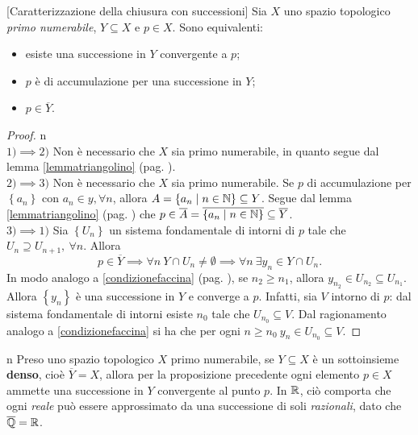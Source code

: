 \begin{proposition}{}[Caratterizzazione della chiusura con successioni]
	Sia $X$ uno spazio topologico \textit{primo numerabile}, $Y\subseteq X$ e $p\in X$. Sono equivalenti:
	\begin{itemize}
		\item esiste una successione in $Y$ convergente a $p$;
		\item $p$ è di accumulazione per una successione in $Y$;
		\item $p\in \overline{Y}$.
	\end{itemize}
\end{proposition}
\begin{proof}{n}~{}\\
$1)\implies2)$ Non è necessario che $X$ sia primo numerabile, in quanto segue dal lemma \ref{lemmatriangolino} (pag. \pageref{lemmatriangolino}).\\
$2)\implies3)$ Non è necessario che $X$ sia primo numerabile. Se $p$ di accumulazione per $\left\{a_n\right\}$ con $a_n\in y,\forall n$, allora $A=\left\{a_n\mid n\in \mathbb{N}\right\}\subseteq Y$. Segue dal lemma \ref{lemmatriangolino} (pag. \pageref{lemmatriangolino}) che $p\in \overline{A}=\overline{\left\{a_n\mid n\in \mathbb{N}\right\}}\subseteq \overline{Y}$.\\
$3)\implies1)$ Sia $\left\{U_n\right\}$ un sistema fondamentale di intorni di $p$ tale che $U_n\supseteq U_{n+1},\ \forall n$. Allora
\begin{equation*}
	p\in \overline{Y}\implies \forall n\ Y\cap U_n\neq\emptyset\implies\forall n\ \exists y_n\in Y\cap U_n.
\end{equation*}
In modo analogo a \eqref{condizionefaccina} (pag. \pageref{condizionefaccina}), se $n_2\geq n_1$, allora $y_{n_2}\in U_{n_2}\subseteq U_{n_1}$. Allora $\left\{y_n\right\}$ è una successione in $Y$ e converge a $p$. Infatti, sia $V$ intorno di $p$: dal sistema fondamentale di intorni esiste $n_0$ tale che $U_{n_0}\subseteq V$. Dal ragionamento analogo a \eqref{condizionefaccina} si ha che per ogni $n\geq n_0\ y_n\in U_{n_0}\subseteq V$.\qedhere
\end{proof}
\begin{remark}{n}\label{densitaesuccessioni}
	Preso uno spazio topologico $X$ primo numerabile, se $Y\subseteq X$ è un sottoinsieme \textbf{denso}, cioè $\overline{Y}=X$, allora per la proposizione precedente ogni elemento $p\in X$ ammette una successione in $Y$ convergente al punto $p$. In $\mathbb{R}$, ciò comporta che ogni \textit{reale} può essere approssimato da una successione di soli \textit{razionali}, dato che $\overline{\mathbb{Q}}=\mathbb{R}$.
\end{remark}
